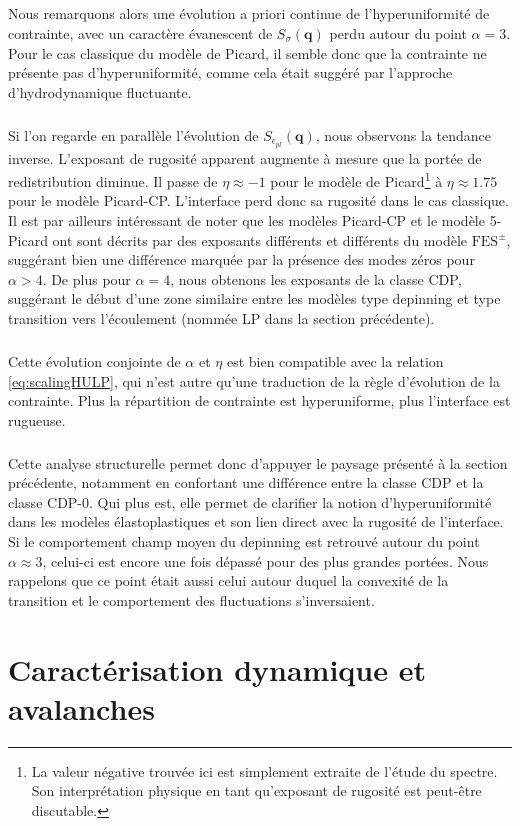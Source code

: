 \subparagraph{}Nous remarquons alors une évolution a priori continue de l'hyperuniformité de contrainte, avec un caractère évanescent de $S_\sigma(\mathbf{q})$ perdu autour du point $\alpha=3$. Pour le cas classique du modèle de Picard, il semble donc que la contrainte ne présente pas d'hyperuniformité, comme cela était suggéré par l'approche d'hydrodynamique fluctuante.

\subparagraph{}Si l'on regarde en parallèle l'évolution de $S_{\epsilon_{pl}}(\mathbf{q})$, nous observons la tendance inverse. L'exposant de rugosité apparent augmente à mesure que la portée de redistribution diminue. Il passe de $\eta\approx -1$ pour le modèle de Picard\footnote{La valeur négative trouvée ici est simplement extraite de l'étude du spectre. Son interprétation physique en tant qu'exposant de rugosité est peut-être discutable.} à $\eta\approx 1.75$ pour le modèle Picard-CP. L'interface perd donc sa rugosité dans le cas classique. Il est par ailleurs intéressant de noter que les modèles Picard-CP et le modèle 5-Picard ont sont décrits par des exposants différents et différents du modèle $\text{FES}^\pm$, suggérant bien une différence marquée par la présence des modes zéros pour $\alpha>4$. De plus pour $\alpha=4$, nous obtenons les exposants de la classe CDP, suggérant le début d'une zone similaire entre les modèles type depinning et type transition vers l'écoulement (nommée LP dans la section précédente).

\subparagraph{}Cette évolution conjointe de $\alpha$ et $\eta$ est bien compatible avec la relation \autoref{eq:scalingHULP}, qui n'est autre qu'une traduction de la règle d'évolution de la contrainte. Plus la répartition de contrainte est hyperuniforme, plus l'interface est rugueuse.

\subparagraph{}Cette analyse structurelle permet donc d'appuyer le paysage présenté à la section précédente, notamment en confortant une différence entre la classe CDP et la classe CDP-0. Qui plus est, elle permet de clarifier la notion d'hyperuniformité dans les modèles élastoplastiques et son lien direct avec la rugosité de l'interface. Si le comportement champ moyen du depinning est retrouvé autour du point $\alpha \approx 3$, celui-ci est encore une fois dépassé pour des plus grandes portées. Nous rappelons que ce point était aussi celui autour duquel la convexité de la transition et le comportement des fluctuations s'inversaient.

\section{Caractérisation dynamique et avalanches}

